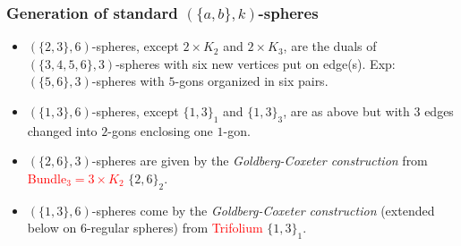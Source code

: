 \documentclass{beamer}
\begin{document}
\begin{frame}\frametitle{Generation of standard $(\{a,b\},k)$-spheres}
\begin{itemize}

\item $(\{2,3\},6)$-spheres, except $2\times K_2$ and $2\times K_3$, are
the duals of  $(\{3,4,5,6\},3)$-spheres with six new
vertices put on  edge(s).
Exp: $(\{5, 6\},3)$-spheres
with $5$-gons organized in six pairs.

\item $(\{1,3\},6)$-spheres, except $\{1,3\}_1$  and $\{1,3\}_3$,
are as above but
with $3$  edges changed
into
$2$-gons
enclosing one $1$-gon.

\item $(\{2,6\},3)$-spheres are given by the {\em Goldberg-Coxeter
construction}
from  \textcolor{red}{Bundle$_3=3\times K_2$} $\{2,6\}_{2}$.
\item
$(\{1,3\},6)$-spheres come by the {\em Goldberg-Coxeter
construction} (extended below on $6$-regular spheres)
from
 \textcolor{red}{Trifolium} $\{1,3\}_{1}$.

 \end{itemize}


\end{frame}
\end{document}
